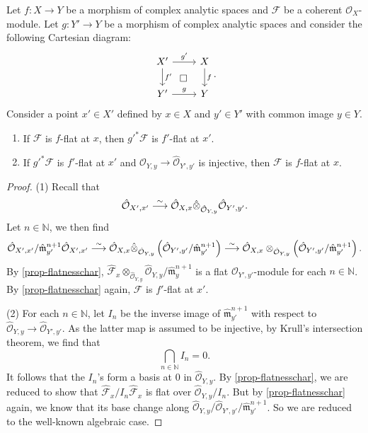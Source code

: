 \begin{proposition}
    Let $f:X\rightarrow Y$ be a morphism of complex analytic spaces and $\mathcal{F}$ be a coherent $\mathcal{O}_X$-module. Let $g:Y'\rightarrow Y$ be a morphism of complex analytic spaces and consider the following Cartesian diagram:
    \[
        \begin{tikzcd}
            X' \arrow[r,"g'"] \arrow[d, "f'"] \arrow[rd, "\square", phantom] & X \arrow[d, "f"] \\
            Y' \arrow[r,"g"]                                                & Y               
        \end{tikzcd}.  
    \]
    Consider a point $x'\in X'$ defined by $x\in X$ and $y'\in Y'$ with common image $y\in Y$. 
    \begin{enumerate}
        \item If $\mathcal{F}$ is $f$-flat at $x$, then $g'^{*}\mathcal{F}$ is $f'$-flat at $x'$.
        \item If $g'^*\mathcal{F}$ is $f'$-flat at $x'$ and $\hat{\mathcal{O}}_{Y,y}\rightarrow \hat{\mathcal{O}}_{Y',y'}$ is injective, then $\mathcal{F}$ is $f$-flat at $x$.
    \end{enumerate}
\end{proposition}
\begin{proof}
    (1) Recall that
    \[
        \hat{\mathcal{O}}_{X',x'}\stackrel{\sim}{\longrightarrow}   \hat{\mathcal{O}}_{X,x}\hat{\otimes}_{\hat{\mathcal{O}}_{Y,y}}\hat{\mathcal{O}}_{Y',y'}.
    \]
    Let $n\in \mathbb{N}$, we then find
    \[
        \hat{\mathcal{O}}_{X',x'}/\hat{\mathfrak{m}}_{y'}^{n+1}\hat{\mathcal{O}}_{X',x'}\stackrel{\sim}{\longrightarrow}   \hat{\mathcal{O}}_{X,x}\hat{\otimes}_{\hat{\mathcal{O}}_{Y,y}}\left(\hat{\mathcal{O}}_{Y',y'}/\hat{\mathfrak{m}}_{y'}^{n+1}\right)\stackrel{\sim}{\longrightarrow}  \hat{\mathcal{O}}_{X,x}\otimes_{\hat{\mathcal{O}}_{Y,y}}\left(\hat{\mathcal{O}}_{Y',y'}/\hat{\mathfrak{m}}_{y'}^{n+1}\right).
    \]
    By \cref{prop-flatnesschar}, $\hat{\mathcal{F}}_x\otimes_{\hat{\mathcal{O}}_{Y,y}}\hat{\mathcal{O}}_{Y,y}/\hat{\mathfrak{m}}_y^{n+1}$ is a flat $\mathcal{O}_{Y',y'}$-module for each $n\in \mathbb{N}$. By \cref{prop-flatnesschar} again, $\mathcal{F}$ is $f'$-flat at $x'$.

    (2) For each $n\in \mathbb{N}$, let $I_n$ be the inverse image of $\hat{\mathfrak{m}}_{y'}^{n+1}$ with respect to $\hat{\mathcal{O}}_{Y,y}\rightarrow \hat{\mathcal{O}}_{Y',y'}$. As the latter map is assumed to be injective, by Krull's intersection theorem, we find that
    \[
        \bigcap_{n\in \mathbb{N}}I_n=0.  
    \]
    It follows that the $I_n$'s form a basis at $0$ in $\hat{\mathcal{O}}_{Y,y}$. By \cref{prop-flatnesschar}, we are reduced to show that $\hat{\mathcal{F}}_x/I_n\hat{\mathcal{F}}_x$ is flat over $\hat{\mathcal{O}}_{Y,y}/I_n$. But by \cref{prop-flatnesschar} again, we know that its base change along $\hat{\mathcal{O}}_{Y,y}/\hat{\mathcal{O}}_{Y',y'}/\hat{\mathfrak{m}}_{y'}^{n+1}$. So we are reduced to the well-known algebraic case.
\end{proof}



